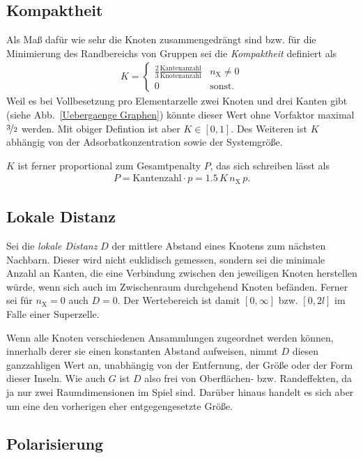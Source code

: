 \documentclass[a4paper, 10pt, twoside, openany]{book} %
\def \nX {n_\mathrm{X}}
\begin{document}
	\subsection{Kompaktheit}
	
	Als Maß dafür wie sehr die Knoten zusammengedrängt sind bzw. für die Minimierung des Randbereichs von Gruppen sei die \emph{Kompaktheit} definiert als
	\begin{align*}
		K = \begin{cases} \frac 2 3 \frac{\text{Kantenanzahl}}{\text{Knotenanzahl}} & \nX \neq 0 \\ 0 & \text{sonst.} \end{cases}
	\end{align*}
	Weil es bei Vollbesetzung pro Elementarzelle zwei Knoten und drei Kanten gibt (siehe Abb.~\ref{Uebergaenge Graphen}) könnte dieser Wert ohne Vorfaktor maximal $\nicefrac 3 2$ werden. Mit obiger Defintion ist aber $K \in [0, 1]$. Des Weiteren ist $K$ abhängig von der Adsorbatkonzentration sowie der Systemgröße.
	
	$K$ ist ferner proportional zum Gesamtpenalty $P$, das sich schreiben lässt als
	\begin{align*}
		P = \text{Kantenzahl} \cdot p = 1.5 \, K \, \nX \, p.
	\end{align*}
	
	\subsection{Lokale Distanz}
	
	Sei die \emph{lokale Distanz} $D$ der mittlere Abstand eines Knotens zum nächsten Nachbarn. Dieser wird nicht euklidisch gemessen, sondern sei die minimale Anzahl an Kanten, die eine Verbindung zwischen den jeweiligen Knoten herstellen würde, wenn sich auch im Zwischenraum durchgehend Knoten befänden. Ferner sei für $\nX = 0$ auch $D = 0$. Der Wertebereich ist damit $[0, \infty]$ bzw. $[0, 2 l]$ im Falle einer Superzelle.
	
	Wenn alle Knoten verschiedenen Ansammlungen zugeordnet werden können, innerhalb derer sie einen konstanten Abstand aufweisen, nimmt $D$ diesen ganzzahligen Wert an, unabhängig von der Entfernung, der Größe oder der Form dieser Inseln. Wie auch $G$ ist $D$ also frei von Oberflächen- bzw. Randeffekten, da ja nur zwei Raumdimensionen im Spiel sind. Darüber hinaus handelt es sich aber um eine den vorherigen eher entgegengesetzte Größe.
	
	\subsection{Polarisierung}
	
\end{document}
